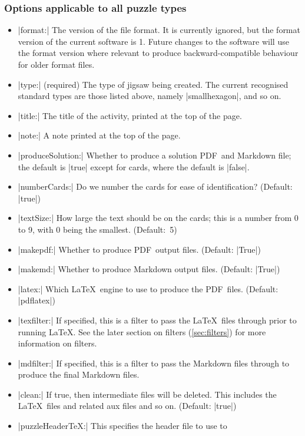 \documentclass{article}
\def\PDF{{\small PDF}}
\begin{document}
\subsubsection*{Options applicable to all puzzle types}

\begin{itemize}
\item |format:| The version of the file format.  It is currently
  ignored, but the format version of the current software is 1.
  Future changes to the software will use the format version where
  relevant to produce backward-compatible behaviour for older format
  files.
\item |type:| (required) The type of jigsaw being created.  The
  current recognised standard types are those listed above, namely
  |smallhexagon|, and so on.
\item |title:| The title of the activity, printed at
  the top of the page.
\item |note:| A note printed at the top of the page.
\item |produceSolution:| Whether to produce a solution \PDF\ and
  Markdown file; the default is |true| except for cards, where
  the default is |false|.
\item |numberCards:| Do we number the cards for ease of
  identification?  (Default: |true|)
\item |textSize:| How large the text should be on the cards; this
  is a number from 0 to 9, with 0 being the smallest.  (Default:~5)
\item |makepdf:| Whether to produce \PDF\ output files.  (Default:
  |True|)
\item |makemd:| Whether to produce Markdown output files.  (Default:
  |True|)
\item |latex:| Which \LaTeX\ engine to use to produce the \PDF\
  files.  (Default: |pdflatex|)
\item |texfilter:| If specified, this is a filter to pass the \LaTeX\
  files through prior to running \LaTeX.  See the later section on
  filters (\ref{sec:filters}) for more information on filters.
\item |mdfilter:| If specified, this is a filter to pass the Markdown
  files through to produce the final Markdown files.
\item |clean:| If true, then intermediate files will be deleted.
  This includes the \LaTeX\ files and related aux files and so on.
  (Default: |true|)
\item |puzzleHeaderTeX:| This specifies the header file to use to

\end{itemize}
\end{document}

